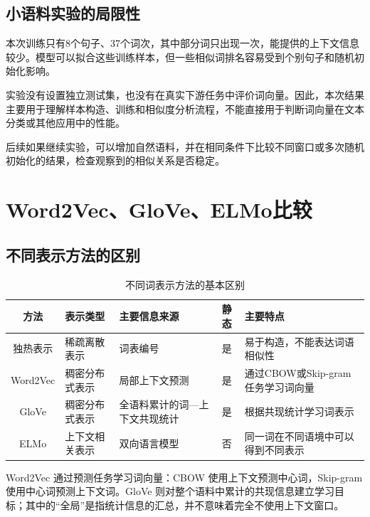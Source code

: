 \documentclass[UTF8,a4paper,zihao=-4,fontset=none]{ctexart}
\newcommand{\ReportTableHead}[1]{\textbf{#1}}
\begin{document}
\subsection{小语料实验的局限性}

本次训练只有8个句子、37个词次，其中部分词只出现一次，能提供的上下文信息较少。模型可以拟合这些训练样本，但一些相似词排名容易受到个别句子和随机初始化影响。

实验没有设置独立测试集，也没有在真实下游任务中评价词向量。因此，本次结果主要用于理解样本构造、训练和相似度分析流程，不能直接用于判断词向量在文本分类或其他应用中的性能。

后续如果继续实验，可以增加自然语料，并在相同条件下比较不同窗口或多次随机初始化的结果，检查观察到的相似关系是否稳定。

\FloatBarrier
\section{Word2Vec、GloVe、ELMo比较}

\subsection{不同表示方法的区别}

\begin{table}[htbp]
\centering\small
\caption{不同词表示方法的基本区别}\label{tab:methods}
\begin{tabularx}{\linewidth}{c>{\centering\arraybackslash}m{24mm}YcY}
\toprule
\ReportTableHead{方法} & \ReportTableHead{表示类型} & \ReportTableHead{主要信息来源} & \ReportTableHead{静态} & \ReportTableHead{主要特点}\\
\midrule
独热表示 & 稀疏离散表示 & 词表编号 & 是 & 易于构造，不能表达词语相似性\\
Word2Vec & 稠密分布式表示 & 局部上下文预测 & 是 & 通过CBOW或Skip-gram任务学习词向量\\
GloVe & 稠密分布式表示 & 全语料累计的词—上下文共现统计 & 是 & 根据共现统计学习词表示\\
ELMo & 上下文相关表示 & 双向语言模型 & 否 & 同一词在不同语境中可以得到不同表示\\
\bottomrule
\end{tabularx}
\end{table}

Word2Vec 通过预测任务学习词向量：CBOW 使用上下文预测中心词，Skip-gram 使用中心词预测上下文词\cite{word2vec}。GloVe 则对整个语料中累计的共现信息建立学习目标；其中的“全局”是指统计信息的汇总，并不意味着完全不使用上下文窗口\cite{glove}。
\end{document}
